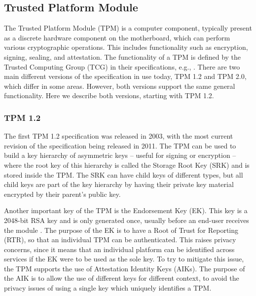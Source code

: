 \subsection{Trusted Platform Module}
\label{sec:kappa-tpm}

The Trusted Platform Module (TPM) is a computer component, typically present as a discrete hardware component on the motherboard, which can perform various cryptographic operations.
This includes functionality such as encryption, signing, sealing, and attestation.
The functionality of a TPM is defined by the Trusted Computing Group (TCG) in their specifications, e.g., \cite{TPM1.2spec,TPM2.0r38}.
There are two main different versions of the specification in use today, TPM 1.2 and TPM 2.0, which differ in some areas.
However, both versions support the same general functionality.
Here we describe both versions, starting with TPM 1.2.

\subsubsection{TPM 1.2}
\label{sec:kappa-tpm12}

The first TPM 1.2 specification was released in 2003, with the most current revision of the specification being \cite{TPM1.2spec} released in 2011.
The TPM can be used to build a key hierarchy of asymmetric keys -- useful for signing or encryption -- where the root key of this hierarchy is called the Storage Root Key (SRK) and is stored inside the TPM.
The SRK can have child keys of different types, but all child keys are part of the key hierarchy by having their private key material encrypted by their parent's public key.

Another important key of the TPM is the Endorsement Key (EK).
This key is a 2048-bit RSA key and is only generated once, usually before an end-user receives the module \cite{TPM1.2spec}.
The purpose of the EK is to have a Root of Trust for Reporting (RTR), so that an individual TPM can be authenticated.
This raises privacy concerns, since it means that an individual platform can be identified across services if the EK were to be used as the sole key.
To try to mitigate this issue, the TPM supports the use of Attestation Identity Keys (AIKs).
The purpose of the AIK is to allow the use of different keys for different context, to avoid the privacy issues of using a single key which uniquely identifies a TPM.


